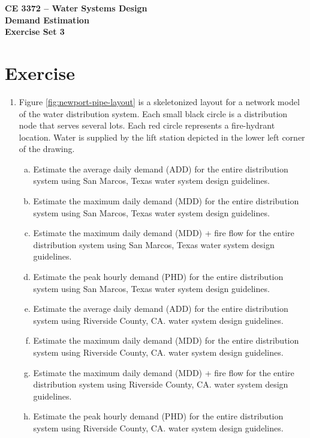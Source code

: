 \documentclass[12pt]{article}
\begin{document}
\begin{center}
{\textbf{{ CE 3372 -- Water Systems Design} \\ {Demand Estimation} \\ {Exercise Set 3}}}
\end{center}

\section*{\small{Exercise}} 
\begin{enumerate}
\item %




Figure \ref{fig:newport-pipe-layout} is a skeletonized layout for a network model of the water distribution system.
Each small black circle is a distribution node that serves several lots.
Each red circle represents a fire-hydrant location.
Water is supplied by the lift station depicted in the lower left corner of the drawing.   

\begin{enumerate}[a)]
\item Estimate the average daily demand (ADD) for the entire distribution system using San Marcos, Texas water system design guidelines.
\item Estimate the maximum daily demand (MDD) for the entire distribution system using San Marcos, Texas water system design guidelines.
\item Estimate the maximum daily demand (MDD) + fire flow for the entire distribution system using San Marcos, Texas water system design guidelines.
\item Estimate the peak hourly demand (PHD) for the entire distribution system using San Marcos, Texas water system design guidelines.
\item Estimate the average daily demand (ADD) for the entire distribution system using Riverside County, CA. water system design guidelines.
\item Estimate the maximum daily demand (MDD) for the entire distribution system using Riverside County, CA. water system design guidelines.
\item Estimate the maximum daily demand (MDD) + fire flow for the entire distribution system using Riverside County, CA. water system design guidelines.
\item Estimate the peak hourly demand (PHD) for the entire distribution system using Riverside County, CA. water system design guidelines.
\end{enumerate}


\end{enumerate}
\end{document}
